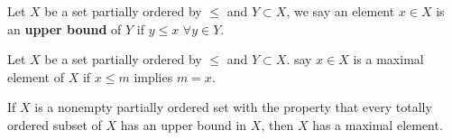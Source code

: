 \begin{definition}\rm\nextline
    Let $X$ be a set partially ordered by $\leq$ and $Y\subset X$, we say an element $x\in X$ is an {\bf upper bound} of $Y$ if $y\leq x\,\,\forall y\in Y$.

\end{definition}

\begin{definition}\rm\nextline
    Let $X$ be a set partially ordered by $\leq$ and $Y\subset X$. say $x\in X$ is a maximal element of $X$ if $x\leq m$ implies $m=x$.

\end{definition}
\begin{lemma}\label{Zorn's Lemma}\rm\nextline
    If $X$ is a nonempty partially ordered set with the
    property that every totally ordered subset of $X$ has an upper bound in $X$, then $X$ has
    a maximal element.
\end{lemma}